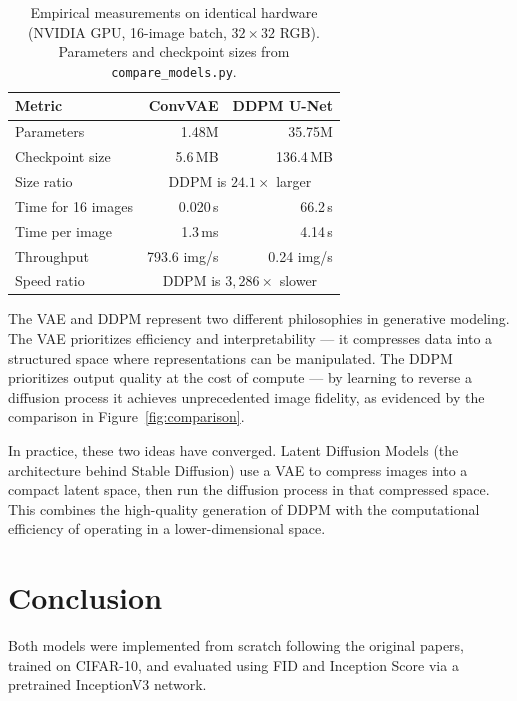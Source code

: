 \documentclass{article}
\begin{document}
\begin{table}[H]
\centering
\caption{Empirical measurements on identical hardware (NVIDIA GPU, 16-image batch, $32{\times}32$ RGB). Parameters and checkpoint sizes from \texttt{compare\_models.py}.}
\begin{tabular}{l r r}
\toprule
\textbf{Metric} & \textbf{ConvVAE} & \textbf{DDPM U-Net} \\
\midrule
Parameters            & 1.48M       & 35.75M \\
Checkpoint size       & 5.6\,MB     & 136.4\,MB \\
Size ratio            & \multicolumn{2}{c}{DDPM is $24.1\times$ larger} \\[4pt]
Time for 16 images    & 0.020\,s    & 66.2\,s \\
Time per image        & 1.3\,ms     & 4.14\,s \\
Throughput            & 793.6 img/s & 0.24 img/s \\
Speed ratio           & \multicolumn{2}{c}{DDPM is $3{,}286\times$ slower} \\
\bottomrule
\end{tabular}
\label{tab:empirical}
\end{table}

The VAE and DDPM represent two different philosophies in generative modeling. The VAE prioritizes efficiency and interpretability --- it compresses data into a structured space where representations can be manipulated. The DDPM prioritizes output quality at the cost of compute --- by learning to reverse a diffusion process it achieves unprecedented image fidelity, as evidenced by the comparison in Figure~\ref{fig:comparison}.

In practice, these two ideas have converged. Latent Diffusion Models (the architecture behind Stable Diffusion) use a VAE to compress images into a compact latent space, then run the diffusion process in that compressed space. This combines the high-quality generation of DDPM with the computational efficiency of operating in a lower-dimensional space.

\newpage
\section{Conclusion}

Both models were implemented from scratch following the original papers, trained on CIFAR-10, and evaluated using FID and Inception Score via a pretrained InceptionV3 network.
\end{document}
